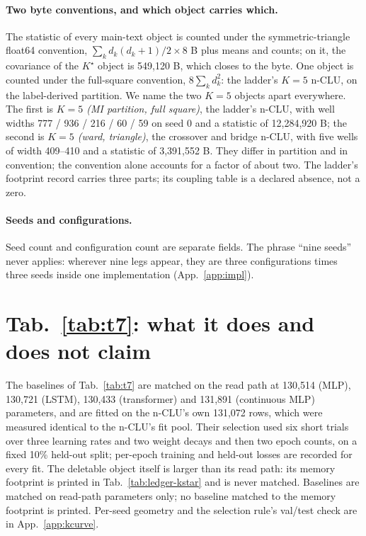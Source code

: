 \documentclass{article} %
\newcommand{\Kstar}{\ensuremath{K^{\star}}}
\begin{document}
\paragraph{Two byte conventions, and which object carries which.} The statistic of every
main-text object is counted under the symmetric-triangle float64 convention,
$\sum_k d_k(d_k+1)/2\times8$ B plus means and counts; on it, the covariance of the $\Kstar$
object is 549,120 B, which closes to the byte. %
One object is counted under the full-square convention, $8\sum_k d_k^2$: the ladder's $K=5$ n-CLU,
on the label-derived partition. We name the two $K=5$ objects apart everywhere. The first is
\emph{$K=5$ (MI partition, full square)}, the ladder's n-CLU, with well widths 777 / 936 / 216 / 60 /
59 on seed 0 and a statistic of 12,284,920 B; the second is \emph{$K=5$ (ward, triangle)}, the
crossover and bridge n-CLU, with five wells of width 409--410 and a statistic of 3,391,552 B.
They differ in partition and in convention; the convention alone accounts for a factor of about two.
The ladder's footprint record carries three parts; its coupling table is a declared absence, not a
zero. %

\paragraph{Seeds and configurations.} Seed count and configuration count are separate fields. The
phrase ``nine seeds'' never applies: wherever nine legs appear, they are three configurations
times three seeds inside one implementation (App.~\ref{app:impl}).

\section{Tab.~\ref{tab:t7}: what it does and does not claim}
\label{app:t7more}
The baselines of Tab.~\ref{tab:t7} are matched on the read path at 130,514 (MLP), 130,721 (LSTM), %
130,433 (transformer) and 131,891 (continuous MLP) parameters, and are fitted on the n-CLU's own %
131,072 rows, which were measured identical to the n-CLU's fit pool. Their selection used six short %
trials over three learning rates and two weight decays and then two epoch counts, on a fixed 10\%
held-out split; per-epoch training and held-out losses are recorded for every fit. %
The deletable object itself is larger than its read path: its memory footprint is printed
in Tab.~\ref{tab:ledger-kstar} and is never matched. Baselines are matched on read-path
parameters only; no baseline matched to the memory footprint is printed.
Per-seed geometry and the selection rule's val/test check are in App.~\ref{app:kcurve}.
\end{document}
